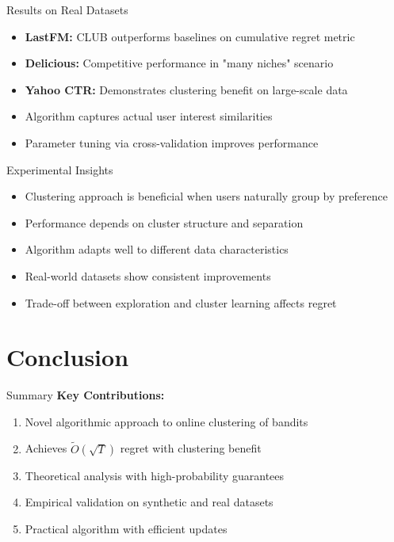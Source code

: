 \documentclass[11pt]{beamer}
\begin{document}
\begin{frame}{Results on Real Datasets}
  \begin{itemize}
    \item \textbf{LastFM:} CLUB outperforms baselines on cumulative regret metric
    \item \textbf{Delicious:} Competitive performance in "many niches" scenario
    \item \textbf{Yahoo CTR:} Demonstrates clustering benefit on large-scale data
    \item Algorithm captures actual user interest similarities
    \item Parameter tuning via cross-validation improves performance
  \end{itemize}
\end{frame}

\begin{frame}{Experimental Insights}
  \begin{itemize}
    \item Clustering approach is beneficial when users naturally group by preference
    \item Performance depends on cluster structure and separation
    \item Algorithm adapts well to different data characteristics
    \item Real-world datasets show consistent improvements
    \item Trade-off between exploration and cluster learning affects regret
  \end{itemize}
\end{frame}

\section{Conclusion}

\begin{frame}{Summary}
  \textbf{Key Contributions:}
  \begin{enumerate}
    \item Novel algorithmic approach to online clustering of bandits
    \item Achieves $\tilde{O}(\sqrt{T})$ regret with clustering benefit
    \item Theoretical analysis with high-probability guarantees
    \item Empirical validation on synthetic and real datasets
    \item Practical algorithm with efficient updates
  \end{enumerate}
\end{frame}
\end{document}
